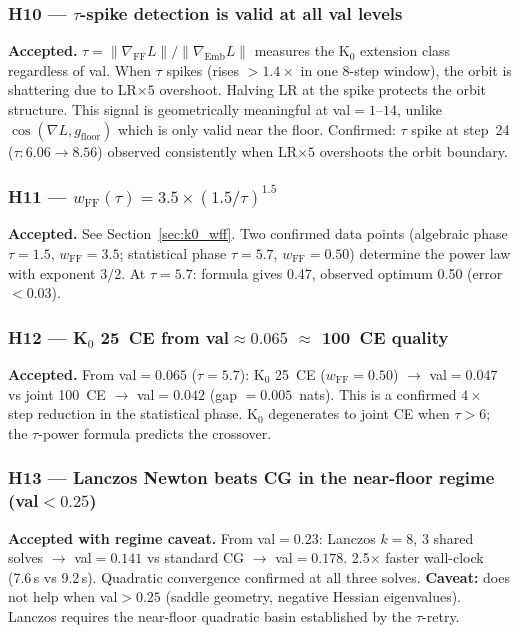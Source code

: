 \documentclass[11pt]{amsart}
\begin{document}
\subsubsection*{H10 — $\tau$-spike detection is valid at all val levels}

\textbf{Accepted.}
$\tau = \|\nabla_\mathrm{FF} L\| / \|\nabla_\mathrm{Emb} L\|$
measures the K$_0$ extension class regardless of val.
When $\tau$ spikes (rises $>1.4\times$ in one 8-step window),
the orbit is shattering due to LR$\times 5$ overshoot.
Halving LR at the spike protects the orbit structure.
This signal is geometrically meaningful at val$=1$--$14$,
unlike $\cos(\nabla L, g_\mathrm{floor})$ which is only valid near the floor.
Confirmed: $\tau$ spike at step~24 ($\tau: 6.06 \to 8.56$) observed
consistently when LR$\times 5$ overshoots the orbit boundary.

\subsubsection*{H11 — $w_\mathrm{FF}(\tau) = 3.5 \times (1.5/\tau)^{1.5}$}

\textbf{Accepted.}
See Section~\ref{sec:k0_wff}.
Two confirmed data points (algebraic phase $\tau=1.5$, $w_\mathrm{FF}=3.5$;
statistical phase $\tau=5.7$, $w_\mathrm{FF}=0.50$) determine
the power law with exponent $3/2$.
At $\tau=5.7$: formula gives 0.47, observed optimum 0.50 (error $<0.03$).

\subsubsection*{H12 — K$_0$ 25~CE from val$\approx 0.065$ $\approx$ 100~CE quality}

\textbf{Accepted.}
From val$=0.065$ ($\tau=5.7$): K$_0$ 25~CE ($w_\mathrm{FF}=0.50$) $\to$
val$=0.047$ vs joint 100~CE $\to$ val$=0.042$ (gap $=0.005$~nats).
This is a confirmed $4\times$ step reduction in the statistical phase.
K$_0$ degenerates to joint CE when $\tau > 6$;
the $\tau$-power formula predicts the crossover.

\subsubsection*{H13 — Lanczos Newton beats CG in the near-floor regime (val$<0.25$)}

\textbf{Accepted with regime caveat.}
From val$=0.23$: Lanczos $k=8$, 3 shared solves $\to$ val$=0.141$
vs standard CG $\to$ val$=0.178$.
2.5$\times$ faster wall-clock (7.6\,s vs 9.2\,s).
Quadratic convergence confirmed at all three solves.
\textbf{Caveat:} does not help when val$>0.25$ (saddle geometry,
negative Hessian eigenvalues).
Lanczos requires the near-floor quadratic basin established by the
$\tau$-retry.
\end{document}
